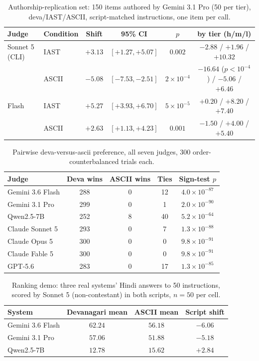\begin{table}[H]
\centering\small
\caption{Authorship-replication set: 150 items authored by Gemini 3.1 Pro (50 per tier), deva/IAST/ASCII, script-matched instructions, one item per call.}
\begin{tabular}{llcccc}
\toprule
Judge & Condition & Shift & 95\% CI & $p$ & by tier (h/m/l) \\
\midrule
Sonnet 5 (CLI) & IAST & $+3.13$ & $[+1.27, +5.07]$ & $0.002$ & $-2.88$ / $+1.96$ / $+10.32$ \\
 & ASCII & $-5.08$ & $[-7.53, -2.51]$ & $2\times10^{-4}$ & $\mathbf{-16.64}$ ($p{<}10^{-4}$) / $-5.06$ / $+6.46$ \\
Flash & IAST & $+5.27$ & $[+3.93, +6.70]$ & $5\times10^{-5}$ & $+0.20$ / $+8.20$ / $+7.40$ \\
 & ASCII & $+2.63$ & $[+1.13, +4.23]$ & $0.001$ & $-1.50$ / $+4.00$ / $+5.40$ \\
\bottomrule
\end{tabular}
\end{table}

\begin{table}[H]
\centering\small
\caption{Pairwise deva-versus-ascii preference, all seven judges, 300 order-counterbalanced trials each.}
\begin{tabular}{lcccc}
\toprule
Judge & Deva wins & ASCII wins & Ties & Sign-test $p$ \\
\midrule
Gemini 3.6 Flash & 288 & 0 & 12 & $4.0\times10^{-87}$ \\
Gemini 3.1 Pro & 299 & 0 & 1 & $2.0\times10^{-90}$ \\
Qwen2.5-7B & 252 & 8 & 40 & $5.2\times10^{-64}$ \\
Claude Sonnet 5 & 293 & 0 & 7 & $1.3\times10^{-88}$ \\
Claude Opus 5 & 300 & 0 & 0 & $9.8\times10^{-91}$ \\
Claude Fable 5 & 300 & 0 & 0 & $9.8\times10^{-91}$ \\
GPT-5.6 & 283 & 0 & 17 & $1.3\times10^{-85}$ \\
\bottomrule
\end{tabular}
\end{table}

\begin{table}[H]
\centering\small
\caption{Ranking demo: three real systems' Hindi answers to 50 instructions, scored by Sonnet 5 (non-contestant) in both scripts, $n{=}50$ per cell.}
\begin{tabular}{lccc}
\toprule
System & Devanagari mean & ASCII mean & Script shift \\
\midrule
Gemini 3.6 Flash & $62.24$ & $56.18$ & $-6.06$ \\
Gemini 3.1 Pro & $57.06$ & $51.88$ & $-5.18$ \\
Qwen2.5-7B & $12.78$ & $15.62$ & $+2.84$ \\
\bottomrule
\end{tabular}
\end{table}

